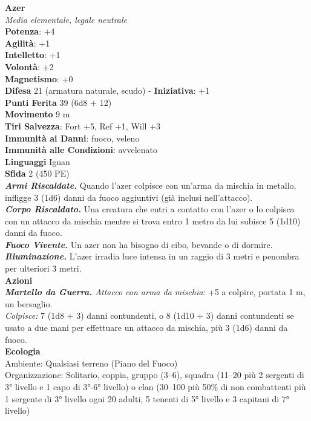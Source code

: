 \begin{multicols}{2}
\medskip\textbf{Azer}\\
\emph{Media elementale, legale neutrale}\\
\textbf{Potenza}: +4\\
\textbf{Agilità}: +1\\
\textbf{Intelletto}: +1\\
\textbf{Volontà}: +2\\
\textbf{Magnetismo}: +0\\
\textbf{Difesa} 21 (armatura naturale, scudo) - \textbf{Iniziativa}: +1\\
\textbf{Punti Ferita} 39 (6d8 + 12)\\
\textbf{Movimento} 9 m\\
\textbf{Tiri Salvezza}: Fort +5, Ref +1, Will +3\\
\textbf{Immunità ai Danni}: fuoco, veleno\\
\textbf{Immunità alle Condizioni}: avvelenato\\
\textbf{Linguaggi} Ignan\\
\textbf{Sfida} 2 (450 PE)\smallskip\\
\emph{\textbf{Armi Riscaldate.}} Quando l'azer colpisce con un'arma da mischia in metallo, infligge 3 (1d6) danni da fuoco aggiuntivi (già inclusi nell'attacco).\\
\emph{\textbf{Corpo Riscaldato.}} Una creatura che entri a contatto con l'azer o lo colpisca con un attacco da mischia mentre si trova entro 1 metro da lui subisce 5 (1d10) danni da fuoco.\\
\emph{\textbf{Fuoco Vivente.}} Un azer non ha bisogno di cibo, bevande o di dormire.\\
\emph{\textbf{Illuminazione.}} L'azer irradia luce intensa in un raggio di 3 metri e penombra per ulteriori 3 metri.\\
\smallskip\textbf{Azioni}\\
\emph{\textbf{Martello da Guerra.} Attacco con arma da mischia}: +5 a colpire, portata 1 m, un bersaglio.\\
\emph{Colpisce:} 7 (1d8 + 3) danni contundenti, o 8 (1d10 + 3) danni contundenti se usato a due mani per effettuare un attacco da mischia, più 3 (1d6) danni da fuoco.\\
\textbf{Ecologia}\\
Ambiente: Qualsiasi terreno (Piano del Fuoco)\\
Organizzazione: Solitario, coppia, gruppo (3–6), squadra (11–20 più 2 sergenti di 3° livello e 1 capo di 3°-6° livello) o clan (30–100 più 50\% di non combattenti più 1 sergente di 3° livello ogni 20 adulti, 5 tenenti di 5° livello e 3 capitani di 7° livello)\\

\end{multicols}
